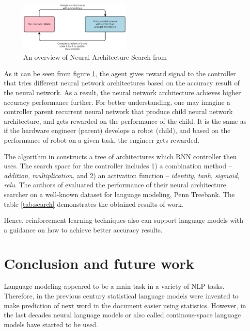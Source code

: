 \documentclass{IEEEtran}
\begin{document}
\begin{figure}[h]
	\centering
	\includegraphics[width=0.5\textwidth]{reinforcement}
	\caption{An overview of Neural Architecture Search from \cite{Quoc2017Reinforcement}}
	\label{fig:rl}
\end{figure}

As it can be seen from figure \ref{fig:rl}, the agent gives reward signal to the controller that tries different neural network architectures based on the accuracy result of the neural network. As a result, the neural network architecture achieves higher accuracy performance further. For better understanding, one may imagine a controller parent recurrent neural network that produce child neural network architecture, and gets rewarded on the performance of the child. It is the same as if the hardware engineer (parent) develops a robot (child), and based on the performance of robot on a given task, the engineer gets rewarded.

The algorithm in \cite{Quoc2017Reinforcement} constructs a tree of architectures which RNN controller then uses. The search space for the controller includes 1) a combination method -- \textit{addition}, \textit{multiplication}, and 2) an activation function -- \textit{identity}, \textit{tanh}, \textit{sigmoid}, \textit{relu}. The authors of \cite{Quoc2017Reinforcement} evaluated the performance of their neural architecture searcher on a well-known dataset for language modeling, Penn Treebank. The table \ref{tab:search} demonstrates the obtained results of \cite{Quoc2017Reinforcement} work.

Hence, reinforcement learning techniques also can support language models with a guidance on how to achieve better accuracy results.

\section{Conclusion and future work}

Language modeling appeared to be a main task in a variety of NLP tasks. Therefore, in the previous century statistical language models were invented to make prediction of next word in the document easier using statistics. However, in the last decades neural language models or also called continous-space language models have started to be used.
\end{document}
